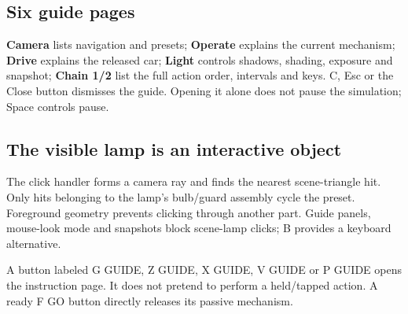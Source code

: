 \documentclass[a4paper,10pt]{article}
\numberwithin{equation}{section}
\begin{document}
\subsection*{Six guide pages}
\textbf{Camera} lists navigation and presets; \textbf{Operate} explains the current mechanism; \textbf{Drive} explains the released car; \textbf{Light} controls shadows, shading, exposure and snapshot; \textbf{Chain 1/2} list the full action order, intervals and keys. C, Esc or the Close button dismisses the guide. Opening it alone does not pause the simulation; Space controls pause.
\subsection*{The visible lamp is an interactive object}
The click handler forms a camera ray and finds the nearest scene-triangle hit. Only hits belonging to the lamp's bulb/guard assembly cycle the preset. Foreground geometry prevents clicking through another part. Guide panels, mouse-look mode and snapshots block scene-lamp clicks; B provides a keyboard alternative.
\begin{keyidea}
A button labeled G GUIDE, Z GUIDE, X GUIDE, V GUIDE or P GUIDE opens the instruction page. It does not pretend to perform a held/tapped action. A ready F GO button directly releases its passive mechanism.
\end{keyidea}
\end{document}
